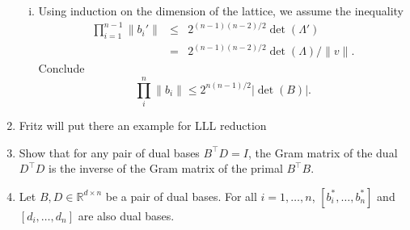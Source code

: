 \documentclass[11pt,a4paper]{article}
\begin{document}
\begin{enumerate}[1)]
\begin{enumerate}[i)]
 \item Using induction on the dimension of the lattice, we assume the inequality
   \begin{eqnarray*}
     ∏_{i=1}^{n-1}  \| b_i'\| & ≤ &   2^{(n-1) (n-2)/2}  \det (Λ') \\
                            & =  & 2^{(n-1) (n-2)/2}  \det (Λ) /\|v\|. 
   \end{eqnarray*}
   Conclude
   \begin{displaymath}
     ∏_i^n \|b_i\| ≤ 2^{n (n-1)/2}  |\det (B)|.
   \end{displaymath}



 \end{enumerate}

 

 
\item Fritz will put there an example for LLL reduction


\item Show that for any pair of dual bases $B^⊤D = I$, the Gram matrix of the dual
$D^⊤D$ is the inverse of the Gram matrix of the primal $B^⊤B$.

\item Let $B,D ∈ \mathbb{R}^{d×n}$ be a pair of dual bases. For all $i = 1, \hdots,n$, $[b^\ast_i, \hdots, b^\ast_n]$ and $[d_i, \hdots , d_n]$ are also dual bases.

  
\end{enumerate}



%
%


 
\end{document}

